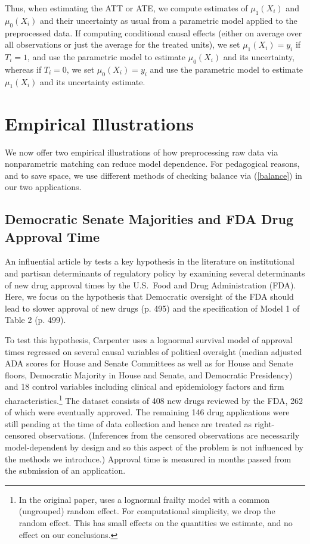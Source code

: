 \documentclass[11pt,titlepage]{article}
\begin{document}
Thus, when estimating the ATT or ATE, we compute estimates of
$\mu_1(X_i)$ and $\mu_0(X_i)$ and their uncertainty as usual from a
parametric model applied to the preprocessed data.  If computing
conditional causal effects (either on average over all observations or
just the average for the treated units), we set $\mu_1(X_i)=y_i$ if
$T_i=1$, and use the parametric model to estimate $\mu_0(X_i)$ and its
uncertainty, whereas if $T_i=0$, we set $\mu_0(X_i)=y_i$ and use the
parametric model to estimate $\mu_1(X_i)$ and its uncertainty
estimate.

\section{Empirical Illustrations}\label{s:emp}

We now offer two empirical illustrations of how preprocessing raw data
via nonparametric matching can reduce model dependence.  For
pedagogical reasons, and to save space, we use different methods of
checking balance via (\ref{balance}) in our two applications.

\subsection{Democratic Senate Majorities and FDA Drug Approval
  Time}\label{s:carp}

An influential article by \citet{Carpenter02} tests a key hypothesis
in the literature on institutional and partisan determinants of
regulatory policy by examining several determinants of new drug
approval times by the U.S.\ Food and Drug Administration (FDA).  Here,
we focus on the hypothesis that Democratic oversight of the FDA should
lead to slower approval of new drugs (p. 495) and the specification of
Model 1 of Table 2 (p. 499).

To test this hypothesis, Carpenter uses a lognormal survival model of
approval times regressed on several causal variables of political
oversight (median adjusted ADA scores for House and Senate Committees
as well as for House and Senate floors, Democratic Majority in House
and Senate, and Democratic Presidency) and 18 control variables
including clinical and epidemiology factors and firm
characteristics.\footnote{In the original paper, \citet{Carpenter02}
  uses a lognormal frailty model with a common (ungrouped) random
  effect.  For computational simplicity, we drop the random effect.
  This has small effects on the quantities we estimate, and no effect
  on our conclusions.}  The dataset consists of 408 new drugs reviewed
by the FDA, 262 of which were eventually approved.  The remaining 146
drug applications were still pending at the time of data collection
and hence are treated as right-censored observations.  (Inferences
from the censored observations are necessarily model-dependent by
design and so this aspect of the problem is not influenced by the
methods we introduce.)  Approval time is measured in months passed
from the submission of an application.
\end{document}
